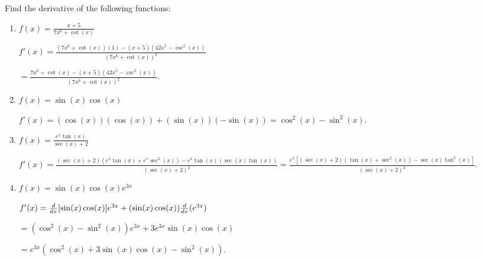 \documentclass[nooutcomes]{ximera}
\begin{document}
\begin{problem}
Find the derivative of the following functions:

	\begin{enumerate}
	
	\item  $f(x) = \frac{x+5}{7x^6 + \cot(x)}$
			\begin{freeResponse}
			$f'(x) = \frac{(7x^6 + \cot(x))(1) - (x+5)(42x^5 - \csc^2(x))}{(7x^6 + \cot(x))^2}$
			
			$= \frac{7x^6 + \cot(x) - (x+5)(42x^5 - \csc^2(x))}{(7x^6 + \cot(x))^2}$.
			\end{freeResponse}
			
			
			
	\item  $f(x) = \sin(x) \cos(x)$
			\begin{freeResponse}
			$f'(x) = (\cos(x))(\cos(x)) + (\sin(x))(-\sin(x)) = \cos^2(x) - \sin^2(x)$.
			\end{freeResponse}
			
			
			
	\item  $f(x) = \frac{e^x \tan(x)}{\sec(x) + 2}$
			\begin{freeResponse}
			$f'(x) = \frac{(\sec(x)+2)(e^x \tan(x) + e^x \sec^2(x)) - e^x \tan(x) (\sec(x) \tan(x))}{(\sec(x) + 2)^2}
			= \frac{e^x[(\sec(x) + 2)(\tan(x) + \sec^2(x)) - \sec(x) \tan^2(x)]}{(\sec(x) + 2)^2}$.
			\end{freeResponse}
			
			
			
	\item  $f(x) = \sin(x) \cos(x) e^{3x}$
			\begin{freeResponse}
			$f'(x) = \frac{d}{dx}[\sin(x) \cos(x)] e^{3x} + (\sin(x) \cos(x)) \frac{d}{dx}(e^{3x})$
			
			$= (\cos^2(x) - \sin^2(x))e^{3x} + 3e^{3x} \sin(x) \cos(x)$
			
			$= e^{3x}(\cos^2(x) + 3\sin(x) \cos(x) - \sin^2(x))$.
			\end{freeResponse}
			
			
			
	\end{enumerate}
		
\end{problem}
\end{document}
